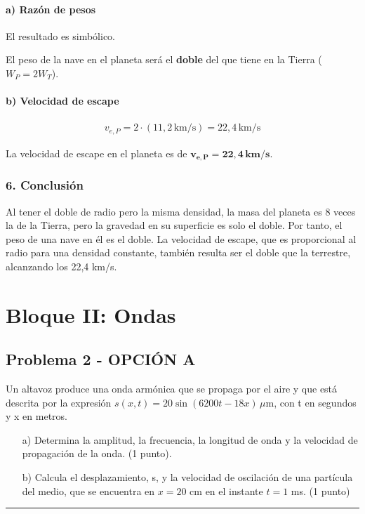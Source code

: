 \paragraph*{a) Razón de pesos}
El resultado es simbólico.
\begin{cajaresultado}
El peso de la nave en el planeta será el \textbf{doble} del que tiene en la Tierra ($W_P = 2 W_T$).
\end{cajaresultado}
\paragraph*{b) Velocidad de escape}
\begin{gather}
    v_{e,P} = 2 \cdot (11,2 \, \text{km/s}) = 22,4 \, \text{km/s}
\end{gather}
\begin{cajaresultado}
La velocidad de escape en el planeta es de $\boldsymbol{v_{e,P} = 22,4 \, \textbf{km/s}}$.
\end{cajaresultado}

\subsubsection*{6. Conclusión}
\begin{cajaconclusion}
Al tener el doble de radio pero la misma densidad, la masa del planeta es 8 veces la de la Tierra, pero la gravedad en su superficie es solo el doble. Por tanto, el peso de una nave en él es el doble. La velocidad de escape, que es proporcional al radio para una densidad constante, también resulta ser el doble que la terrestre, alcanzando los 22,4 km/s.
\end{cajaconclusion}

\newpage

\section{Bloque II: Ondas}
\label{sec:ondas_2015_jul_ext}

\subsection{Problema 2 - OPCIÓN A}
\label{subsec:2A_2015_jul_ext}

\begin{cajaenunciado}
Un altavoz produce una onda armónica que se propaga por el aire y que está descrita por la expresión $s(x,t)=20\sin(6200t-18x)\,\mu\text{m}$, con t en segundos y x en metros.
\begin{enumerate}
    \item[a)] Determina la amplitud, la frecuencia, la longitud de onda y la velocidad de propagación de la onda. (1 punto).
    \item[b)] Calcula el desplazamiento, s, y la velocidad de oscilación de una partícula del medio, que se encuentra en $x=20$ cm en el instante $t=1$ ms. (1 punto)
\end{enumerate}
\end{cajaenunciado}
\hrule

